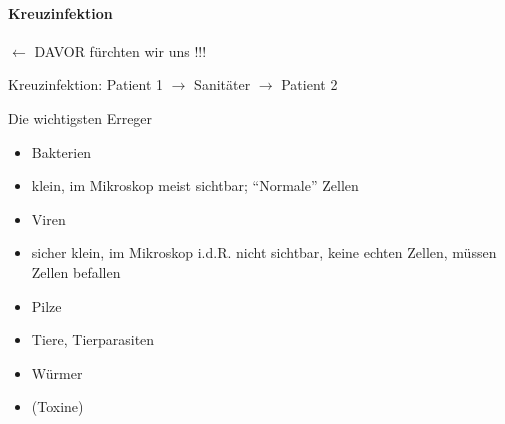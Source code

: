 \documentclass{article}
\begin{document}
\paragraph[]{}
\paragraph[Kreuzinfektion]{Kreuzinfektion}
\begin{center}
\begin{minipage}{6.477cm}
${\leftarrow}$ DAVOR f\"urchten wir uns !!!

\end{minipage}
\end{center}
Kreuzinfektion: Patient 1 ${\rightarrow}$
Sanit\"ater ${\rightarrow}$ Patient 2

Die wichtigsten Erreger

\begin{itemize}
\item Bakterien

\end{itemize}
\begin{itemize}
\item klein, im Mikroskop meist sichtbar;
{\textquotedblleft}Normale{\textquotedblright} Zellen

\end{itemize}
\begin{itemize}
\item Viren

\end{itemize}
\begin{itemize}
\item sicher klein, im Mikroskop i.d.R. nicht sichtbar, keine echten
Zellen, m\"ussen Zellen befallen

\end{itemize}
\begin{itemize}
\item Pilze

\item Tiere, Tierparasiten

\end{itemize}
\begin{itemize}
\item W\"urmer

\end{itemize}
\begin{itemize}
\item (Toxine)

\end{itemize}
\end{document}
